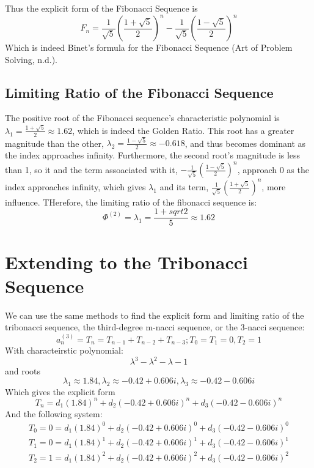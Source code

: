 \documentclass[11pt]{article}
\begin{document}
Thus the explicit form of the Fibonacci Sequence is
    \[F_n=\frac{1}{\sqrt{5}}\left(\frac{1+\sqrt{5}}{2}\right)^n-\frac{1}{\sqrt{5}}\left(\frac{1-\sqrt{5}}{2}\right)^n\]
Which is indeed Binet's formula for the Fibonacci Sequence (Art of Problem Solving, n.d.).

\subsection{Limiting Ratio of the Fibonacci Sequence}
The positive root of the Fibonacci sequence's characteristic polynomial is $\lambda_1=\frac{1+\sqrt{5}}{2}\approx 1.62$, which is indeed the Golden Ratio. This root has a greater magnitude than the other, $\lambda_2=\frac{1-\sqrt{5}}{2}\approx-0.618$, and thus becomes dominant as the index approaches infinity. Furthermore, the second root's magnitude is less than 1, so it and the term assoaciated with it, \(-\frac{1}{\sqrt{5}}\left(\frac{1-\sqrt{5}}{2}\right)^n\), approach 0 as the index approaches infinity, which gives \(\lambda_1\) and its term, \(\frac{1}{\sqrt{5}}\left(\frac{1+\sqrt{5}}{2}\right)^n\), more influence. THerefore, the limiting ratio of the fibonacci sequence is:
\[\Phi^{(2)}=\lambda_1=\frac{1+sqrt{2}}{5}\approx1.62\]



\section{Extending to the Tribonacci Sequence}
We can use the same methods to find the explicit form and limiting ratio of the tribonacci sequence, the third-degree m-nacci sequence, or the 3-nacci sequence:
$$a_{n}^{(3)}=T_n=T_{n-1}+T_{n-2}+T_{n-3};T_0=T_1=0, T_2=1$$
With characteirstic polynomial:
\[\lambda^3-\lambda^2-\lambda-1\]
and roots
\[\lambda_1 \approx 1.84, \lambda_2 \approx -0.42 + 0.606i, \lambda_3 \approx -0.42 - 0.606i\]
Which gives the explicit form
\[T_n=d_1(1.84)^n+d_2(-0.42 + 0.606i)^n+d_3(-0.42 - 0.606i)^n\]
And the following system:
\begin{align*}
    T_0=0=d_1(1.84)^0+d_2(-0.42 + 0.606i)^0+d_3(-0.42 - 0.606i)^0 \\
    T_1=0=d_1(1.84)^1+d_2(-0.42 + 0.606i)^1+d_3(-0.42 - 0.606i)^1 \\
    T_2=1=d_1(1.84)^2+d_2(-0.42 + 0.606i)^2+d_3(-0.42 - 0.606i)^2
\end{align*}
\end{document}
